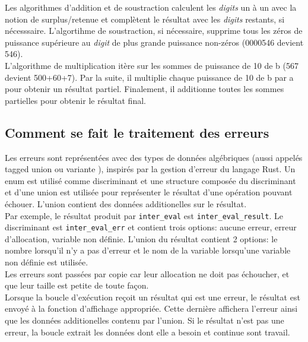 \documentclass[a4paper,12pt,french]{article}
\begin{document}
		Les algorithmes d'addition et de soustraction calculent les \textit{digits} un à un avec la notion de surplus/retenue et complètent le résultat avec les \textit{digits} restants, si nécesssaire. L'algortihme de soustraction, si nécessaire, supprime tous les zéros de puissance supérieure au \textit{digit} de plus grande puissance non-zéros (0000546 devient 546).\\

		L'algorithme de multiplication itère sur les sommes de puissance de 10 de b (567 devient 500+60+7). Par la suite, il multiplie chaque puissance de 10 de b par a pour obtenir un résultat partiel. Finalement, il additionne toutes les sommes partielles pour obtenir le résultat final.
	\subsection{Comment se fait le traitement des erreurs}
		Les erreurs sont représentées avec des types de données algébriques (aussi appelés  \og tagged union \fg{}
		ou \og variante \fg{}), inspirés par la gestion d'erreur du langage Rust. Un enum est utilisé comme
		discriminant et une structure composée du discriminant et d'une union est utilisée pour représenter
		le résultat d'une opération pouvant échouer. L'union contient des données additionelles sur le
		résultat.\\

		Par exemple, le résultat produit par \lstinline$inter_eval$ est \lstinline$inter_eval_result$. Le discriminant
		est \lstinline$inter_eval_err$ et contient trois options: aucune erreur, erreur d'allocation, variable
		non définie. L'union du résultat contient 2 options: le nombre lorsqu'il n'y a pas d'erreur et
		le nom de la variable lorsqu'une variable non définie est utilisée.\\

		Les erreurs sont passées par copie car leur allocation ne doit pas échoucher, et que leur taille
		est petite de toute façon.\\

		Lorsque la boucle d'exécution reçoit un résultat qui est une erreur, le résultat est envoyé à la
		fonction d'affichage appropriée. Cette dernière affichera l'erreur ainsi que les données additionelles
		contenu par l'union. Si le résultat n'est pas une erreur, la boucle extrait les données dont elle
		a besoin et continue sont travail.
\end{document}

